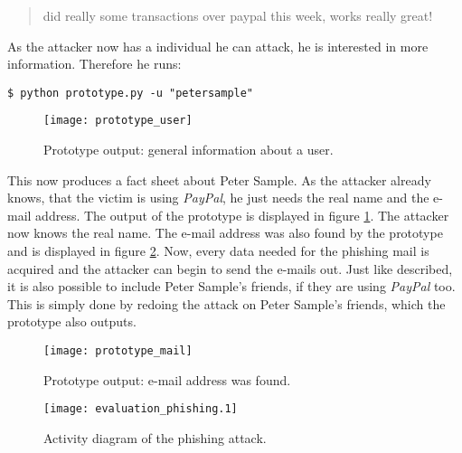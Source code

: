 \begin{quote}
did really some transactions over paypal this week, works really great!
\end{quote}

As the attacker now has a individual he can attack, he is interested in more
information. Therefore he runs:

\lstset{language=bash}
\begin{lstlisting}
$ python prototype.py -u "petersample"
\end{lstlisting}

\begin{figure}[htb]
  \begin{center}
    \texttt{[image: prototype\_user]}
    \caption{Prototype output: general information about a user.}
    \label{fig:prototype_user}
  \end{center}
\end{figure}

This now produces a fact sheet about Peter Sample. As the attacker already
knows, that the victim is using \textit{PayPal}, he just needs the real name
and the e-mail address. The output of the prototype is displayed in figure
\ref{fig:prototype_user}. The attacker now knows the real name. The e-mail
address was also found by the prototype and is displayed in figure
\ref{fig:prototype_mail}. Now, every data needed for the phishing mail is
acquired and the attacker can begin to send the e-mails out. Just like described,
it is also possible to include Peter Sample's friends, if they are using
\textit{PayPal} too. This is simply done by redoing the attack on Peter
Sample's friends, which the prototype also outputs.

\begin{figure}[htb]
  \begin{center}
    \texttt{[image: prototype\_mail]}
    \caption{Prototype output: e-mail address was found.}
    \label{fig:prototype_mail}
  \end{center}
\end{figure}

\begin{figure}[ht]
  \begin{center}
    \texttt{[image: evaluation\_phishing.1]}
    \label{fig:evaluation_phishing}
    \caption{Activity diagram of the phishing attack.}
  \end{center}
\end{figure}

